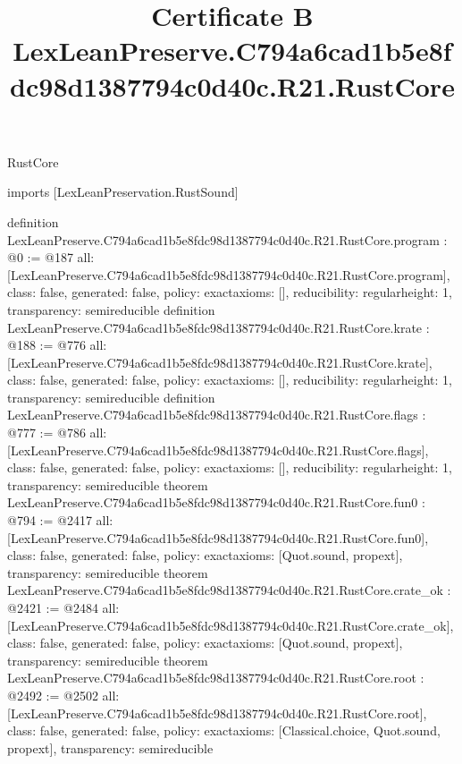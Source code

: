 \begin{lexlean}{RustCore}
\title{Certificate B LexLeanPreserve.C794a6cad1b5e8fdc98d1387794c0d40c.R21.RustCore}
\begin{coremodule}
imports [LexLeanPreservation.RustSound]

definition LexLeanPreserve.C794a6cad1b5e8fdc98d1387794c0d40c.R21.RustCore.program : @0 := @187 {
  all: [LexLeanPreserve.C794a6cad1b5e8fdc98d1387794c0d40c.R21.RustCore.program],
  class: false,
  generated: false,
  policy: exact{axioms: []},
  reducibility: regular{height: 1},
  transparency: semireducible
}
definition LexLeanPreserve.C794a6cad1b5e8fdc98d1387794c0d40c.R21.RustCore.krate : @188 := @776 {
  all: [LexLeanPreserve.C794a6cad1b5e8fdc98d1387794c0d40c.R21.RustCore.krate],
  class: false,
  generated: false,
  policy: exact{axioms: []},
  reducibility: regular{height: 1},
  transparency: semireducible
}
definition LexLeanPreserve.C794a6cad1b5e8fdc98d1387794c0d40c.R21.RustCore.flags : @777 := @786 {
  all: [LexLeanPreserve.C794a6cad1b5e8fdc98d1387794c0d40c.R21.RustCore.flags],
  class: false,
  generated: false,
  policy: exact{axioms: []},
  reducibility: regular{height: 1},
  transparency: semireducible
}
theorem LexLeanPreserve.C794a6cad1b5e8fdc98d1387794c0d40c.R21.RustCore.fun0 : @794 := @2417 {
  all: [LexLeanPreserve.C794a6cad1b5e8fdc98d1387794c0d40c.R21.RustCore.fun0],
  class: false,
  generated: false,
  policy: exact{axioms: [Quot.sound, propext]},
  transparency: semireducible
}
theorem LexLeanPreserve.C794a6cad1b5e8fdc98d1387794c0d40c.R21.RustCore.crate_ok : @2421 := @2484 {
  all: [LexLeanPreserve.C794a6cad1b5e8fdc98d1387794c0d40c.R21.RustCore.crate_ok],
  class: false,
  generated: false,
  policy: exact{axioms: [Quot.sound, propext]},
  transparency: semireducible
}
theorem LexLeanPreserve.C794a6cad1b5e8fdc98d1387794c0d40c.R21.RustCore.root : @2492 := @2502 {
  all: [LexLeanPreserve.C794a6cad1b5e8fdc98d1387794c0d40c.R21.RustCore.root],
  class: false,
  generated: false,
  policy: exact{axioms: [Classical.choice, Quot.sound, propext]},
  transparency: semireducible
}


\end{coremodule}
\end{lexlean}
